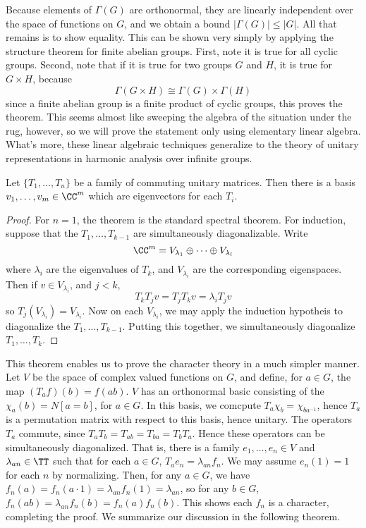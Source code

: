 Because elements of $\Gamma(G)$ are orthonormal, they are linearly independent over the space of functions on $G$, and we obtain a bound $|\Gamma(G)| \leq |G|$. All that remains is to show equality. This can be shown very simply by applying the structure theorem for finite abelian groups. First, note it is true for all cyclic groups. Second, note that if it is true for two groups $G$ and $H$, it is true for $G \times H$, because
%
\[ \Gamma(G \times H) \cong \Gamma(G) \times \Gamma(H) \]
%
since a finite abelian group is a finite product of cyclic groups, this proves the theorem. This seems almost like sweeping the algebra of the situation under the rug, however, so we will prove the statement only using elementary linear algebra. What's more, these linear algebraic techniques generalize to the theory of unitary representations in harmonic analysis over infinite groups.

\begin{theorem}
    Let $\{ T_1, \dots, T_n \}$ be a family of commuting unitary matrices. Then there is a basis $v_1, \dots, v_m \in \CC^m$ which are eigenvectors for each $T_i$.
\end{theorem}
\begin{proof}
    For $n = 1$, the theorem is the standard spectral theorem. For induction, suppose that the $T_1, \dots, T_{k-1}$ are simultaneously diagonalizable. Write
    \[ \CC^m = V_{\lambda_1} \oplus \dots \oplus V_{\lambda_l} \]
    where $\lambda_i$ are the eigenvalues of $T_k$, and $V_{\lambda_i}$ are the corresponding eigenspaces. Then if $v \in V_{\lambda_i}$, and $j < k$,
    \[ T_k T_j v = T_j T_k v = \lambda_i T_j v \]
    so $T_j(V_{\lambda_i}) = V_{\lambda_i}$. Now on each $V_{\lambda_i}$, we may apply the induction hypotheis to diagonalize the $T_1, \dots, T_{k-1}$. Putting this together, we simultaneously diagonalize $T_1, \dots, T_k$.
\end{proof}

This theorem enables us to prove the character theory in a much simpler manner. Let $V$ be the space of complex valued functions on $G$, and define, for $a \in G$, the map $(T_a f)(b) = f(ab)$. $V$ has an orthonormal basic consisting of the $\chi_a(b) = N [a = b]$, for $a \in G$. In this basis, we comcpute $T_a \chi_b = \chi_{ba^{-1}}$, hence $T_a$ is a permutation matrix with respect to this basis, hence unitary. The operators $T_a$ commute, since $T_aT_b = T_{ab} = T_{ba} = T_b T_a$. Hence these operators can be simultaneously diagonalized. That is, there is a family $e_1, \dots, e_n \in V$ and $\lambda_{an} \in \TT$ such that for each $a \in G$, $T_a e_n = \lambda_{an} f_n$. We may assume $e_n(1) = 1$ for each $n$ by normalizing. Then, for any $a \in G$, we have $f_n(a) = f_n(a \cdot 1) = \lambda_{an} f_n(1) = \lambda_{an}$, so for any $b \in G$, $f_n(ab) = \lambda_{an} f_n(b) = f_n(a) f_n(b)$. This shows each $f_n$ is a character, completing the proof. We summarize our discussion in the following theorem.

